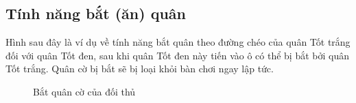 \subsection{Tính năng bắt (ăn) quân}
Hình sau đây là ví dụ về tính năng bắt quân theo đường chéo của quân Tốt trắng đối với quân Tốt đen, sau khi quân Tốt đen này tiến vào ô có thể bị bắt bởi quân Tốt trắng. Quân cờ bị bắt sẽ bị loại khỏi bàn chơi ngay lập tức.
\begin{figure}[H]
\caption{Bắt quân cờ của đối thủ}
\end{figure}

